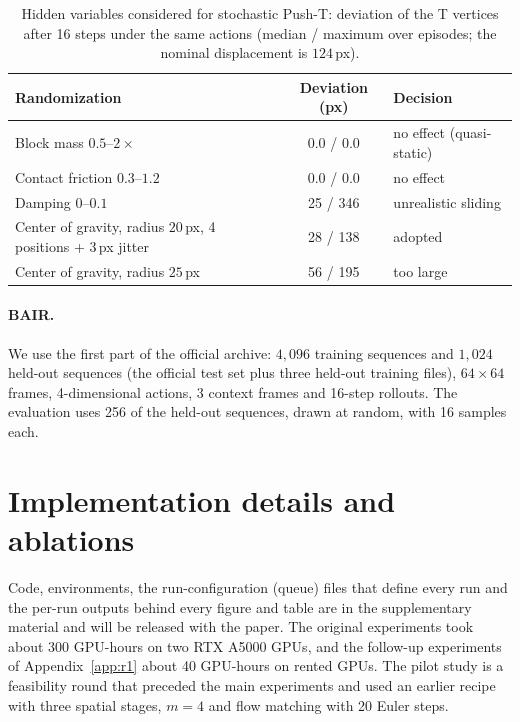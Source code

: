 \begin{table}[h]
\caption{Hidden variables considered for stochastic Push-T: deviation of the T vertices after 16 steps under the same actions (median / maximum over episodes; the nominal displacement is $124$\,px).}
\label{tab:cog}
\begin{center}
\small
\begin{tabular}{lcl}
\toprule
Randomization & Deviation (px) & Decision \\
\midrule
Block mass $0.5$--$2\times$ & 0.0 / 0.0 & no effect (quasi-static) \\
Contact friction $0.3$--$1.2$ & 0.0 / 0.0 & no effect \\
Damping $0$--$0.1$ & 25 / 346 & unrealistic sliding \\
Center of gravity, radius $20$\,px, 4 positions + 3\,px jitter & 28 / 138 & adopted \\
Center of gravity, radius $25$\,px & 56 / 195 & too large \\
\bottomrule
\end{tabular}
\end{center}
\end{table}

\paragraph{BAIR.}
We use the first part of the official archive: $4{,}096$ training sequences and $1{,}024$ held-out sequences (the official test set plus three held-out training files), $64\times64$ frames, 4-dimensional actions, 3 context frames and 16-step rollouts. The evaluation uses 256 of the held-out sequences, drawn at random, with 16 samples each.

\FloatBarrier
\section{Implementation details and ablations}
\label{app:impl}
Code, environments, the run-configuration (queue) files that define every run and the per-run outputs behind every figure and table are in the supplementary material and will be released with the paper. The original experiments took about 300 GPU-hours on two RTX A5000 GPUs, and the follow-up experiments of Appendix~\ref{app:r1} about 40 GPU-hours on rented GPUs. The pilot study is a feasibility round that preceded the main experiments and used an earlier recipe with three spatial stages, $m{=}4$ and flow matching with 20 Euler steps.

